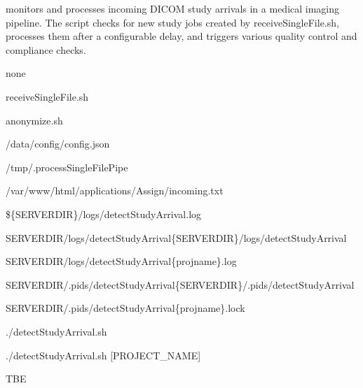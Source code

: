 \documentclass[letterpaper,10pt,english]{sphinxmanual}
\begin{document}
\sphinxstepscope

\sphinxAtStartPar
{} monitors and processes incoming DICOM study arrivals in a medical imaging pipeline. The script checks for new study jobs created by receiveSingleFile.sh, processes them after a configurable delay, and triggers various quality control and compliance checks.

\sphinxAtStartPar
{}

\begin{DUlineblock}{0em}
\item[] \sphinxhyphen{}  none
\item[] \sphinxhyphen{} 
\item[]
\begin{DUlineblock}{\DUlineblockindent}
\item[] \sphinxhyphen{} receiveSingleFile.sh
\item[] \sphinxhyphen{} anonymize.sh
\item[] \sphinxhyphen{} /data/config/config.json
\item[] \sphinxhyphen{} /tmp/.processSingleFilePipe
\item[] \sphinxhyphen{} /var/www/html/applications/Assign/incoming.txt
\end{DUlineblock}
\item[] \sphinxhyphen{} 
\item[]
\begin{DUlineblock}{\DUlineblockindent}
\item[] \sphinxhyphen{} \$\{SERVERDIR\}/logs/detectStudyArrival.log
\item[] \sphinxhyphen{} SERVERDIR/logs/detectStudyArrival\{SERVERDIR\}/logs/detectStudyArrival
\item[] \sphinxhyphen{} SERVERDIR/logs/detectStudyArrival\{projname\}.log
\end{DUlineblock}
\item[] \sphinxhyphen{} 
\item[]
\begin{DUlineblock}{\DUlineblockindent}
\item[] \sphinxhyphen{} SERVERDIR/.pids/detectStudyArrival\{SERVERDIR\}/.pids/detectStudyArrival
\item[] \sphinxhyphen{} SERVERDIR/.pids/detectStudyArrival\{projname\}.lock
\end{DUlineblock}
\item[] \sphinxhyphen{} 
\item[]
\begin{DUlineblock}{\DUlineblockindent}
\item[] \sphinxhyphen{} ./detectStudyArrival.sh
\item[] \sphinxhyphen{} ./detectStudyArrival.sh {[}PROJECT\_NAME{]}
\end{DUlineblock}
\item[] \sphinxhyphen{}  TBE
\end{DUlineblock}
\end{document}
